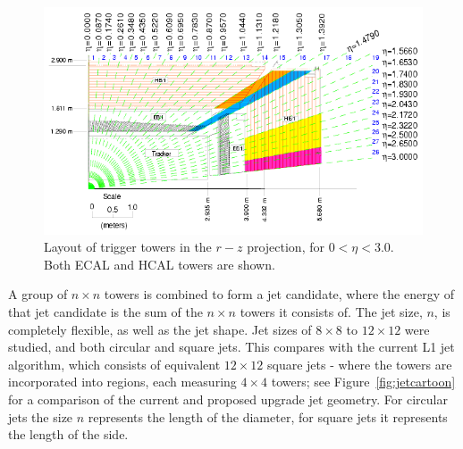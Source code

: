 \begin{figure}[ht]
\begin{center}
  \includegraphics[scale=0.67]{Figures/l1jets/towerGeometry}

\caption{Layout of trigger towers in the $r-z$ projection, for $0<\eta<3.0$. Both \ac{ECAL} and \ac{HCAL} towers are shown.}
\label{fig:towerGeo}
\end{center}
\end{figure}

A group of $n \times n$ towers is combined to form a jet candidate, where the energy of that jet candidate is the sum of the $n \times n$ towers it consists of. 
The jet size, $n$, is completely flexible, as well as the jet shape. 
Jet sizes of $8\times8$ to $12\times12$ were studied, and both circular and square jets. 
This compares with the current \ac{L1} jet algorithm, which consists of equivalent $12\times12$ square jets 
- where the towers are incorporated into regions, each measuring $4\times4$ towers; see Figure~\ref{fig:jetcartoon} for a comparison of the current and proposed upgrade jet geometry.
For circular jets the size $n$ represents the length of the diameter, 
for square jets it represents the length of the side. 

